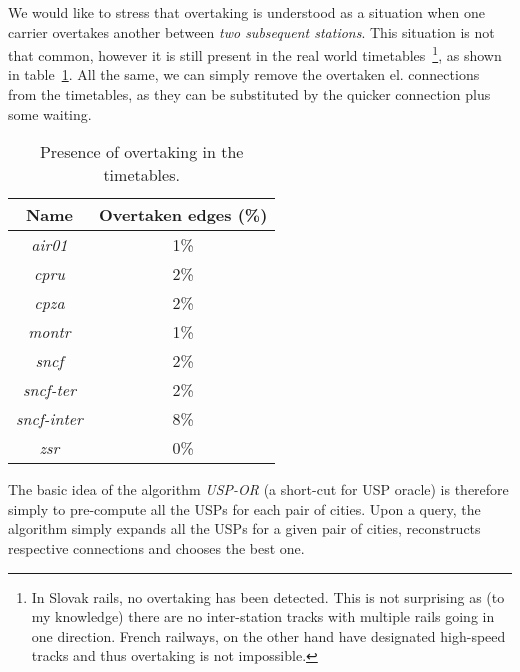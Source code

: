     \noindent We would like to stress that overtaking is understood as a situation when one carrier overtakes another between \textit{two subsequent stations}. This situation is not that common, however it is still present in the real world timetables~\footnote{In Slovak rails, no overtaking has been detected. This is not surprising as (to my knowledge) there are no inter-station tracks with multiple rails going in one direction. French railways, on the other hand have designated high-speed tracks and thus overtaking is not impossible.}, as shown in table~\ref{tab:overtake}. All the same, we can simply remove the overtaken el. connections from the timetables, as they can be substituted by the quicker connection plus some waiting. \\
    
    \begin{table}[h!]
    	\centering
		\begin{tabular}{c|c}
            \rowcolor{tablehead}
        	\textbf{Name} & \textbf{Overtaken edges (\%)} \\
			\hline
			\textit{air01} & 1\% \\
			\textit{cpru} & 2\% \\
			\textit{cpza} & 2\% \\
			\textit{montr} & 1\% \\
			\textit{sncf} & 2\% \\
			\textit{sncf-ter} & 2\% \\
			\textit{sncf-inter} & 8\% \\
			\textit{zsr} & 0\% \\
		\end{tabular}
		\caption{\label{tab:overtake} Presence of overtaking in the timetables.}
	\end{table}
	
	\noindent The basic idea of the algorithm \textit{USP-OR} (a short-cut for USP oracle) is therefore simply to pre-compute all the USPs for each pair of cities. Upon a query, the algorithm simply expands all the USPs for a given pair of cities, reconstructs respective connections and chooses the best one. \\
	
